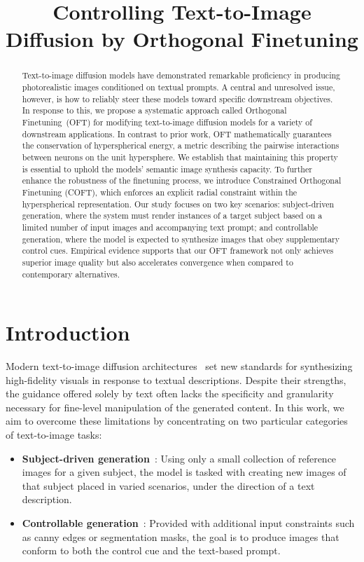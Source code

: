 \title{Controlling Text-to-Image Diffusion by Orthogonal Finetuning}

\begin{abstract}
Text-to-image diffusion models have demonstrated remarkable proficiency in producing photorealistic images conditioned on textual prompts. A central and unresolved issue, however, is how to reliably steer these models toward specific downstream objectives. In response to this, we propose a systematic approach called Orthogonal Finetuning~(OFT) for modifying text-to-image diffusion models for a variety of downstream applications. In contrast to prior work, OFT mathematically guarantees the conservation of hyperspherical energy, a metric describing the pairwise interactions between neurons on the unit hypersphere. We establish that maintaining this property is essential to uphold the models' semantic image synthesis capacity. To further enhance the robustness of the finetuning process, we introduce Constrained Orthogonal Finetuning (COFT), which enforces an explicit radial constraint within the hyperspherical representation. Our study focuses on two key scenarios: subject-driven generation, where the system must render instances of a target subject based on a limited number of input images and accompanying text prompt; and controllable generation, where the model is expected to synthesize images that obey supplementary control cues. Empirical evidence supports that our OFT framework not only achieves superior image quality but also accelerates convergence when compared to contemporary alternatives.
\end{abstract}

\section{Introduction}

Modern text-to-image diffusion architectures~\cite{saharia2022photorealistic,ramesh2022hierarchical,rombach2022high} set new standards for synthesizing high-fidelity visuals in response to textual descriptions. Despite their strengths, the guidance offered solely by text often lacks the specificity and granularity necessary for fine-level manipulation of the generated content. In this work, we aim to overcome these limitations by concentrating on two particular categories of text-to-image tasks:

\begin{itemize}[leftmargin=*,nosep]

    \item \textbf{Subject-driven generation}~\cite{ruiz2023dreambooth}: Using only a small collection of reference images for a given subject, the model is tasked with creating new images of that subject placed in varied scenarios, under the direction of a text description.
    \item \textbf{Controllable generation}~\cite{zhang2023adding,mou2023t2i}: Provided with additional input constraints such as canny edges or segmentation masks, the goal is to produce images that conform to both the control cue and the text-based prompt.
\end{itemize}


